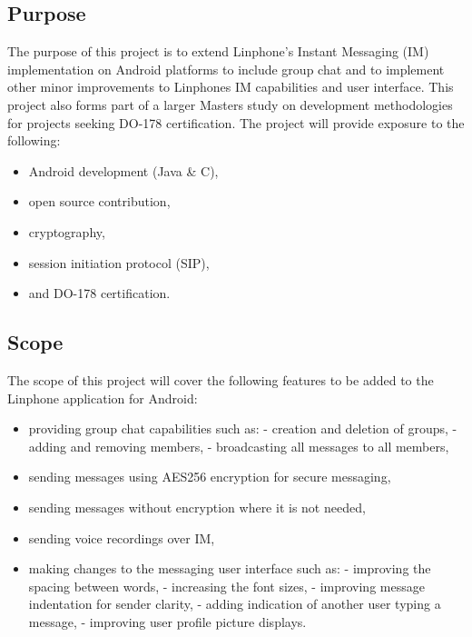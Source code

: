 \documentclass[11pt]{article}
\begin{document}
\subsection{Purpose}
The purpose of this project is to extend Linphone's Instant Messaging (IM) implementation on Android platforms to include group chat and to implement other minor improvements to Linphones IM capabilities and user interface. \newline
This project also forms part of a larger Masters study on development methodologies for projects seeking DO-178 certification.
\newline \newline
The project will provide exposure to the following:
\begin{itemize}
\item Android development (Java \& C),
\item open source contribution,
\item cryptography,
\item session initiation protocol (SIP),
\item and DO-178 certification.
\end{itemize}

\subsection{Scope}
The scope of this project will cover the following features to be added to the Linphone application for Android:
\begin{itemize}
\item providing group chat capabilities such as:
\subitem  - creation and deletion of groups,
\subitem  - adding and removing members,
\subitem  - broadcasting all messages to all members,
\item sending messages using AES256 encryption for secure messaging,
\item sending messages without encryption where it is not needed,
\item sending voice recordings over IM,
\item making changes to the messaging user interface such as:
\subitem  - improving the spacing between words,
\subitem  - increasing the font sizes,
\subitem  - improving message indentation for sender clarity,
\subitem  - adding indication of another user typing a message,
\subitem  - improving user profile picture displays.
\end{itemize}
\end{document}
